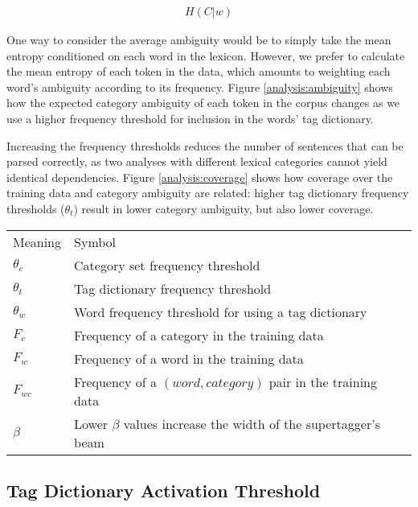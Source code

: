 \begin{eqnarray}
H(C|w)
\end{eqnarray}

One way to consider the average ambiguity would be to simply take the mean entropy conditioned on each word in the lexicon. However, we prefer to calculate the mean entropy of each token in the data, which amounts to weighting each word's ambiguity according to its frequency. Figure \ref{analysis:ambiguity} shows how the expected category ambiguity of each token in the corpus changes as we use a higher frequency threshold for inclusion in the words' tag dictionary.




Increasing the frequency thresholds reduces the number of sentences that can be parsed correctly, as two analyses with different lexical categories cannot yield identical dependencies. Figure \ref{analysis:coverage} shows how coverage over the training data and category ambiguity are related: higher tag dictionary frequency thresholds ($\theta_t$) result in lower category ambiguity, but also lower coverage.

\begin{table}
\begin{tabular}{l|l}
Meaning & Symbol\\
$\theta_{c}$ & Category set frequency threshold\\
$\theta_{t}$ & Tag dictionary frequency threshold\\
$\theta_{w}$ & Word frequency threshold for using a tag dictionary\\
$F_{c}$ & Frequency of a category in the training data\\
$F_{w}$ & Frequency of a word in the training data\\
$F_{wc}$ & Frequency of a $(word, category)$ pair in the training data\\
$\beta$ & Lower $\beta$ values increase the width of the supertagger's beam\\

\end{tabular}
\end{table}

\subsection{Tag Dictionary Activation Threshold}

